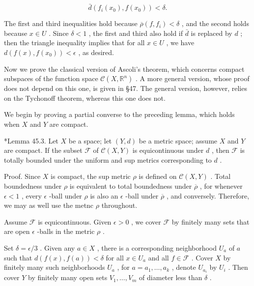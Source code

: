 \documentclass[10pt]{article}
\begin{document}
\[
\bar{d}\left( {{f}_{i}\left( {x}_{0}\right) ,f\left( {x}_{0}\right) }\right)  < \delta .
\]

The first and third inequalities hold because \(\overline{\rho }\left( {f,{f}_{i}}\right)  < \delta\) , and the second holds because \(x \in  U\) . Since \(\delta  < 1\) , the first and third also hold if \(\bar{d}\) is replaced by \(d\) ; then the triangle inequality implies that for all \(x \in  U\) , we have \(d\left( {f\left( x\right) ,f\left( {x}_{0}\right) }\right)  < \epsilon\) , as desired.

Now we prove the classical version of Ascoli's theorem, which concerns compact subspaces of the function space \(\mathcal{C}\left( {X,{\mathbb{R}}^{n}}\right)\) . A more general version, whose proof does not depend on this one, is given in §47. The general version, however, relies on the Tychonoff theorem, whereas this one does not.

We begin by proving a partial converse to the preceding lemma, which holds when \(X\) and \(Y\) are compact.

*Lemma 45.3. Let \(X\) be a space; let \(\left( {Y,d}\right)\) be a metric space; assume \(X\) and \(Y\) are compact. If the subset \(\mathcal{F}\) of \(\mathcal{C}\left( {X,Y}\right)\) is equicontinuous under \(d\) , then \(\mathcal{F}\) is totally bounded under the uniform and sup metrics corresponding to \(d\) .

Proof. Since \(X\) is compact, the sup metric \(\rho\) is defined on \(\mathcal{C}\left( {X,Y}\right)\) . Total boundedness under \(\rho\) is equivalent to total boundedness under \(\overline{\rho }\) , for whenever \(\epsilon  < 1\) , every \(\epsilon\) -ball under \(\rho\) is also an \(\epsilon\) -ball under \(\overline{\rho }\) , and conversely. Therefore, we may as well use the metnc \(\rho\) throughout.

Assume \(\mathcal{F}\) is equicontinuous. Given \(\epsilon  > 0\) , we cover \(\mathcal{F}\) by finitely many sets that are open \(\epsilon\) -balls in the metric \(\rho\) .

Set \(\delta  = \epsilon /3\) . Given any \(a \in  X\) , there is a corresponding neighborhood \({U}_{a}\) of \(a\) such that \(d\left( {f\left( x\right) ,f\left( a\right) }\right)  < \delta\) for all \(x \in  {U}_{a}\) and all \(f \in  \mathcal{F}\) . Cover \(X\) by finitely many such neighborhoods \({U}_{a}\) , for \(a = {a}_{1},\ldots ,{a}_{k}\) , denote \({U}_{{a}_{i}}\) by \({U}_{i}\) . Then cover \(Y\) by finitely many open sets \({V}_{1},\ldots ,{V}_{m}\) of diameter less than \(\delta\) .
\end{document}
